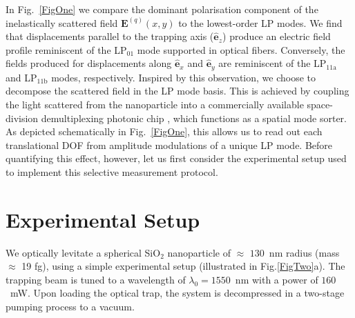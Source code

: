 \documentclass[%
 reprint,
 amsmath,amssymb,
 aps,
pra,
]{revtex4-2}
\begin{document}
In Fig.~\ref{FigOne} we compare the dominant polarisation component of the inelastically scattered field $\boldsymbol{E}^{(q)}(x, y)$ to the lowest-order LP modes. We find that displacements parallel to the trapping axis ($\boldsymbol{\hat{e}}_{z}$) produce an electric field profile reminiscent of the LP$_{01}$ mode supported in optical fibers. Conversely, the fields produced for displacements along $\boldsymbol{\hat{e}}_{x}$ and $\boldsymbol{\hat{e}}_{y}$ are reminiscent of the LP$_{11\mathrm{a}}$ and LP$_{11\mathrm{b}}$ modes, respectively. Inspired by this observation, we choose to decompose the scattered field in the LP mode basis. This is achieved by coupling the light scattered from the nanoparticle into a commercially available space-division demultiplexing photonic chip \cite{noauthor_lpmux_nodate}, which functions as a spatial mode sorter. As depicted schematically in Fig.~\ref{FigOne}, this allows us to read out each translational DOF from amplitude modulations of a unique LP mode. Before quantifying this effect, however, let us first consider the experimental setup used to implement this selective measurement protocol.

\section{Experimental Setup}

We optically levitate a spherical SiO$_{2}$ nanoparticle of $\approx$ $130$~nm radius (mass $\approx$ 19 fg), using a simple experimental setup (illustrated in Fig.\ref{FigTwo}a). The trapping beam is tuned to a wavelength of $\lambda_{0}=1550$~nm with a power of $160$~mW. Upon loading the optical trap, the system is decompressed in a two-stage pumping process to a vacuum.
\end{document}
